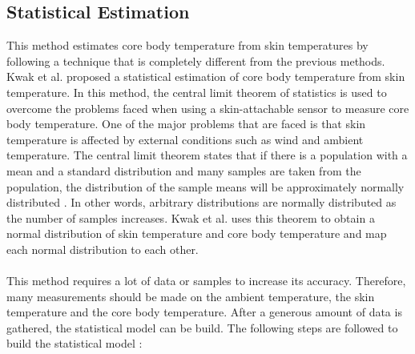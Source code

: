 \subsection{Statistical Estimation}\label{stat}
This method estimates core body temperature from skin temperatures by following a  technique that is completely different from the previous methods. Kwak et al. \cite{Kwak2019} proposed a statistical estimation of core body temperature from skin temperature. In this method, the central limit theorem of statistics is used to overcome the problems faced when using a skin-attachable sensor to measure core body temperature. One of the major problems that are faced is that skin temperature is affected by external conditions such as wind and ambient temperature. The central limit theorem states that if there is a population with a mean and a standard distribution and many samples are taken from the population, the distribution of the sample means will be approximately normally distributed \cite{Sang2017}. In other words, arbitrary distributions are normally distributed as the number of samples increases. Kwak et al. \cite{Kwak2019} uses this theorem to obtain a normal distribution of skin temperature and core body temperature and map each normal distribution to each other. 
\\
\\
This method requires a lot of data or samples to increase its accuracy. Therefore, many measurements should be made on the ambient temperature, the skin temperature and the core body temperature. After a generous amount of data is gathered, the statistical model can be build. The following steps are followed to build the statistical model \cite{Kwak2019}:
